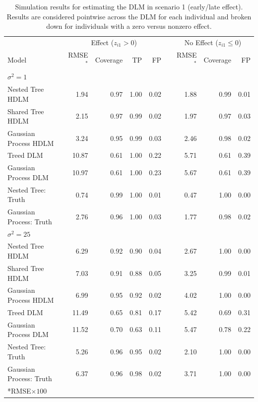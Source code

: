 \documentclass[12pt]{article}
\begin{document}
\begin{table}[!ht]
\scriptsize
    \centering
    \caption{Simulation results for estimating the DLM in scenario 1 (early/late effect). Results are considered pointwise across the DLM for each individual and broken down for individuals with a zero versus nonzero effect. }\vspace{6pt}
    \label{tab:scen1_res}
    \begin{tabular}{lrrrrrrrr}
        \toprule[2pt]
        &\multicolumn{4}{c}{Effect ($z_{i1}>0$)}&&\multicolumn{3}{c}{No Effect ($z_{i1}\leq0$)}\\
        \cmidrule(lr){2-5} \cmidrule(lr){7-9} 
        Model & RMSE$^*$ & Coverage & TP & FP & \phantom{} &RMSE$^*$ & Coverage & FP\\
        \midrule
        \multicolumn{9}{l}{$\sigma^2=1$}\\
      Nested Tree HDLM & 1.94 & 0.97 & 1.00 & 0.02 &  & 1.88 & 0.99 & 0.01 \\
      Shared Tree HDLM & 2.15 & 0.97 & 0.99 & 0.02 &  & 1.97 & 0.97 & 0.03 \\
 Gaussian Process HDLM & 3.24 & 0.95 & 0.99 & 0.03 &  & 2.46 & 0.98 & 0.02 \\
\addlinespace
            Treed DLM & 10.87 & 0.61 & 1.00 & 0.22 &  & 5.71 & 0.61 & 0.39\\
               Gaussian Process DLM & 10.97 & 0.61 & 1.00 & 0.23 &  & 5.67 & 0.61 & 0.39 \\
\addlinespace
   Nested Tree: Truth & 0.74 & 0.99 & 1.00 & 0.01 &  & 0.47 & 1.00 & 0.00   \\
     Gaussian Process: Truth & 2.76 & 0.96 & 1.00 & 0.03 &  & 1.77 & 0.98 & 0.02   \\


\midrule
        
        \multicolumn{9}{l}{$\sigma^2=25$}\\
        Nested Tree HDLM & 6.29 & 0.92 & 0.90 & 0.04 &  & 2.67 & 1.00 & 0.00 \\
        Shared Tree HDLM & 7.03 & 0.91 & 0.88 & 0.05 &  & 3.25 & 0.99 & 0.01 \\
   Gaussian Process HDLM & 6.99 & 0.95 & 0.92 & 0.02 &  & 4.02 & 1.00 & 0.00 \\
\addlinespace
              Treed DLM & 11.49 & 0.65 & 0.81 & 0.17 &  & 5.42 & 0.69 & 0.31 \\
   Gaussian Process DLM & 11.52 & 0.70 & 0.63 & 0.11 &  & 5.47 & 0.78 & 0.22 \\
\addlinespace
      Nested Tree: Truth & 5.26 & 0.96 & 0.95 & 0.02 &  & 2.10 & 1.00 & 0.00  \\
 Gaussian Process: Truth & 6.37 & 0.96 & 0.98 & 0.02 &  & 3.71 & 1.00 & 0.00  \\
        \bottomrule[2pt]
        \multicolumn{9}{l}{*RMSE$\times100$}\\
    \end{tabular}
\end{table}
\end{document}
